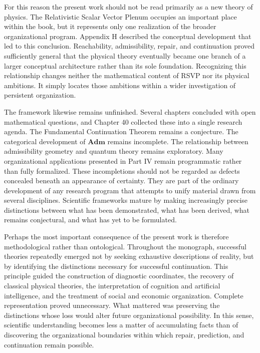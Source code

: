 \documentclass[11pt,oneside]{book}
\numberwithin{equation}{chapter}
\theoremstyle{definition}
\theoremstyle{plain}
\begin{document}
For this reason the present work should not be read primarily as a new
theory of physics. The Relativistic Scalar Vector Plenum occupies an
important place within the book, but it represents only one realization of
the broader organizational program. Appendix H described the conceptual
development that led to this conclusion. Reachability, admissibility,
repair, and continuation proved sufficiently general that the physical
theory eventually became one branch of a larger conceptual architecture
rather than its sole foundation. Recognizing this relationship changes
neither the mathematical content of RSVP nor its physical ambitions. It
simply locates those ambitions within a wider investigation of persistent
organization.

The framework likewise remains unfinished. Several chapters concluded with
open mathematical questions, and Chapter 40 collected these into a single
research agenda. The Fundamental Continuation Theorem remains a
conjecture. The categorical development of \(\mathbf{Adm}\) remains
incomplete. The relationship between admissibility geometry and quantum
theory remains exploratory. Many organizational applications presented in
Part IV remain programmatic rather than fully formalized. These
incompletions should not be regarded as defects concealed beneath an
appearance of certainty. They are part of the ordinary development of any
research program that attempts to unify material drawn from several
disciplines. Scientific frameworks mature by making increasingly precise
distinctions between what has been demonstrated, what has been derived,
what remains conjectural, and what has yet to be formulated.

Perhaps the most important consequence of the present work is therefore
methodological rather than ontological. Throughout the monograph,
successful theories repeatedly emerged not by seeking exhaustive
descriptions of reality, but by identifying the distinctions necessary for
successful continuation. This principle guided the construction of
diagnostic coordinates, the recovery of classical physical theories, the
interpretation of cognition and artificial intelligence, and the treatment
of social and economic organization. Complete representation proved
unnecessary. What mattered was preserving the distinctions whose loss
would alter future organizational possibility. In this sense, scientific
understanding becomes less a matter of accumulating facts than of
discovering the organizational boundaries within which repair, prediction,
and continuation remain possible.
\end{document}
